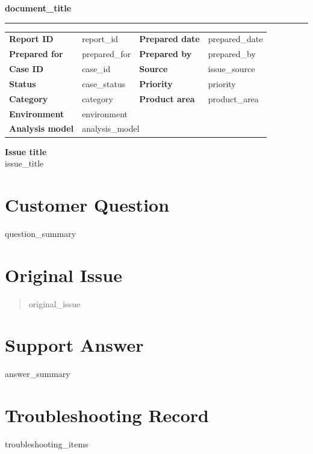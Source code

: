 \documentclass[11pt,a4paper]{article}
\begin{document}
{\Large\textbf{\textcolor{ink}{{{document_title}}}}}

\vspace{2mm}
{\color{brand}\rule{\textwidth}{1.2pt}}

\vspace{3mm}
\begin{tabularx}{\textwidth}{>{\bfseries}p{34mm}X>{\bfseries}p{30mm}X}
Report ID & {{report_id}} & Prepared date & {{prepared_date}} \\
Prepared for & {{prepared_for}} & Prepared by & {{prepared_by}} \\
Case ID & {{case_id}} & Source & {{issue_source}} \\
Status & {{case_status}} & Priority & {{priority}} \\
Category & {{category}} & Product area & {{product_area}} \\
Environment & \multicolumn{3}{X}{{{environment}}} \\
Analysis model & \multicolumn{3}{X}{{{analysis_model}}} \\
\end{tabularx}

\vspace{4mm}
\colorbox{soft}{%
  \parbox{\dimexpr\textwidth-2\fboxsep\relax}{%
    \textbf{Issue title}\\
    {{issue_title}}
  }%
}

\section*{Customer Question}
{{question_summary}}

\section*{Original Issue}
\begin{quote}
\small
{{original_issue}}
\end{quote}

\section*{Support Answer}
{{answer_summary}}

\section*{Troubleshooting Record}
\begin{itemize}
{{troubleshooting_items}}
\end{itemize}
\end{document}
